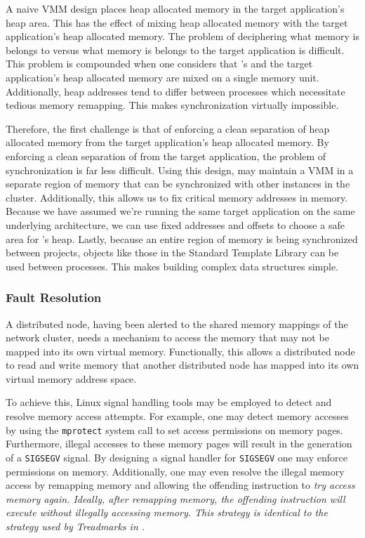 A naive VMM design places \projname{} heap allocated memory in the target application's heap area.  This has the effect of mixing \projname{} heap allocated memory with the target application's heap allocated memory.  The problem of deciphering what memory is belongs to \projname{} versus what memory is belongs to the target application is difficult.  This problem is compounded when one considers that \projname{}'s and the target application's heap allocated memory are mixed on a single memory unit.  Additionally, heap addresses tend to differ between processes which necessitate tedious memory remapping.  This makes synchronization virtually impossible.

Therefore, the first challenge is that of enforcing a clean separation of \projname{} heap allocated memory from the target application's heap allocated memory.  By enforcing a clean separation of \projname{} from the target application, the problem of synchronization is far less difficult.  Using this design, \projname{} may maintain a VMM in a separate region of memory that can be synchronized with other \projname{} instances in the cluster.  Additionally, this allows us to fix critical \projname{} memory addresses in memory.  Because we have assumed we're running the same target application on the same underlying architecture, we can use fixed addresses and offsets to choose a safe area for \projname{}'s heap.  Lastly, because an entire region of memory is being synchronized between projects, objects like those in the Standard Template Library can be used between processes.  This makes building complex data structures simple.

\subsubsection{Fault Resolution}

A distributed node, having been alerted to the shared memory mappings of the network cluster, needs a mechanism to access the memory that may not be mapped into its own virtual memory.  Functionally, this allows a distributed node to read and write memory that another distributed node has mapped into its own virtual memory address space.

To achieve this, Linux signal handling tools may be employed to detect and resolve memory access attempts.  For example, one may detect memory accesses by using the \verb,mprotect, system call to set access permissions on memory pages.  Furthermore, illegal accesses to these memory pages will result in the generation of a \verb,SIGSEGV, signal.  By designing a signal handler for \verb,SIGSEGV, one may enforce permissions on memory.  Additionally, one may even resolve the illegal memory access by remapping memory and allowing the offending instruction to \em try \em access memory again.  Ideally, after remapping memory, the offending instruction will execute without illegally accessing memory.  This strategy is identical to the strategy used by Treadmarks in \cite{Keleher:1994:TDS:1267074.1267084}.


